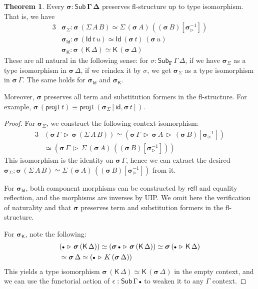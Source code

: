 \documentclass[12pt,a4paper,twoside,openany]{book}
\theoremstyle{remark}
\theoremstyle{definition}
\theoremstyle{theorem}
\newtheorem{theorem}{Theorem}
\newcommand{\bs}[1]{\boldsymbol{#1}}
\newcommand{\refl}{\mathsf{refl}}
\newcommand{\id}{\mathsf{id}}
\newcommand{\Sub}{\mathsf{Sub}}
\newcommand{\Id}{\mathsf{Id}}
\newcommand{\proj}{\mathsf{proj}}
\newcommand{\ext}{\triangleright}
\newcommand{\emptycon}{\scaleobj{.75}\bullet}
\newcommand{\K}{\mathsf{K}}
\newcommand{\bGamma}{\bs{\Gamma}}
\newcommand{\bsigma}{\bs{\sigma}}
\begin{document}
\begin{theorem}\label{thm:flpres}
Every $\bs{\sigma : \Sub\,\Gamma\,\Delta}$ preserves fl-structure up to
type isomorphism. That is, we have
\begin{alignat*}{3}
  & \bsigma_{\Sigma} : \bsigma\,(\Sigma\,A\,B) \simeq \Sigma\,(\bsigma\,A)\,((\bsigma\,B)[\bsigma_{\ext}^{-1}]) \\
  & \bsigma_{\Id} : \bsigma\,(\Id\,t\,u) \simeq \Id\,(\bsigma\,t)\,(\bsigma\,u) \\
  & \bsigma_{\K} : \bsigma\,(\K\,\Delta) \simeq \K\,(\bsigma\,\Delta)
\end{alignat*}
These are all natural in the following sense: for $\sigma :
\Sub_{\bGamma}\,\Gamma\,\Delta$, if we have $\bsigma_{\Sigma}$ as a type
isomorphism in $\bsigma\,\Delta$, if we reindex it by $\sigma$, we get
$\bsigma_{\Sigma}$ as a type isomorphism in $\bsigma\,\Gamma$. The same holds
for $\bsigma_{\Id}$ and $\bsigma_{\K}$.

Moreover, $\bsigma$ preserves all term and substitution formers in the
fl-structure. For example, $\bsigma\,(\proj1\,t) \equiv \proj1\,
(\bsigma_{\Sigma}[\id, \bsigma\,t])$.
\end{theorem}
\begin{proof}
For $\bsigma_{\Sigma}$, we construct the following context isomorphism:
\begin{alignat*}{3}
& (\bsigma\,\Gamma\,\ext\,\bsigma\,(\Sigma\,A\,B)) \simeq
  (\bsigma\,\Gamma\,\ext\,\bsigma\,A\,\ext\,(\bsigma\,B)[\bsigma_{\ext}^{-1}]) \\
& \simeq (\bsigma\,\Gamma\,\ext\,\Sigma\,(\bsigma\,A)\,((\bsigma\,B)[\bsigma_{\ext}^{-1}]))
\end{alignat*}
This isomorphism is the identity on $\bsigma\,\Gamma$, hence we can extract the
desired $\bsigma_{\Sigma} : \bsigma\,(\Sigma\,A\,B) \simeq
\Sigma\,(\bsigma\,A)\,((\bsigma\,B)[\bsigma_{\ext}^{-1}])$ from it.

For $\bsigma_{\Id}$, both component morphisms can be constructed by $\refl$ and
equality reflection, and the morphisms are inverses by UIP. We omit here the
verification of naturality and that $\bsigma$ preserves term and substitution
formers in the fl-structure.

For $\bsigma_{\K}$, note the following:
\begin{alignat*}{3}
  & (\emptycon\,\ext\,\bsigma\,(\K\,\Delta)) \simeq
    (\bsigma\,\emptycon\,\ext\,\bsigma\,(\K\,\Delta)) \simeq
    \bsigma\,(\emptycon\,\ext\,\K\,\Delta)\\
  & \simeq \bsigma\,\Delta \simeq (\emptycon\,\ext\,K\,(\bsigma\,\Delta))
\end{alignat*}
This yields a type isomorphism $\bsigma\,(\K\,\Delta) \simeq
\K\,(\bsigma\,\Delta)$ in the empty context, and we can use the functorial action of
$\epsilon : \Sub\,\Gamma\,\emptycon$ to weaken it to any $\Gamma$ context.
\end{proof}
\end{document}
